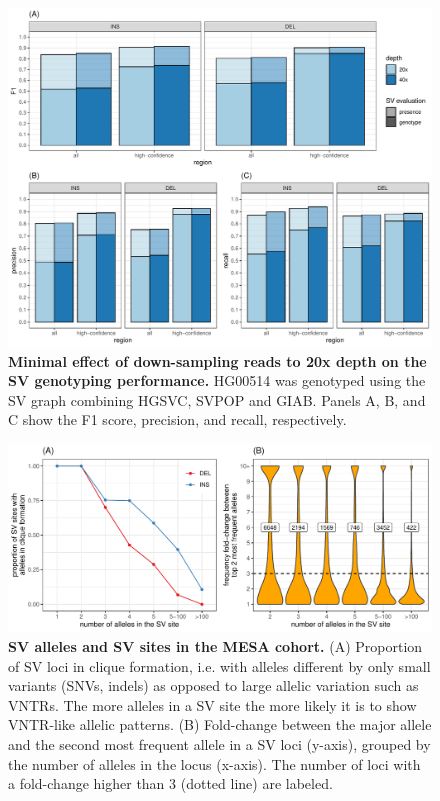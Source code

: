 \documentclass[11pt]{ucscthesis}
\begin{document}
\begin{figure}[H]
    \centering
    \includegraphics[width=.9\linewidth, page=1]{fig-sveval.pdf}
    \caption[Minimal effect of down-sampling reads to 20x depth on the SV genotyping performance]{{\bf Minimal effect of down-sampling reads to 20x depth on the SV genotyping performance.}
      HG00514 was genotyped using the SV graph combining HGSVC, SVPOP and GIAB.
      Panels A, B, and C show the F1 score, precision, and recall, respectively.
    }
    \label{fig:sveval-depth}
\end{figure}



\begin{figure}[H]
    \centering
    \includegraphics[width=.9\linewidth]{fig-sv-mesa-stats-2.pdf}
    \caption[SV alleles and SV sites in the MESA cohort]{{\bf SV alleles and SV sites in the MESA cohort.}
      (A) Proportion of SV loci in clique formation, i.e. with alleles different by only small variants (SNVs, indels) as opposed to large allelic variation such as VNTRs.
      The more alleles in a SV site the more likely it is to show VNTR-like allelic patterns.
      (B) Fold-change between the major allele and the second most frequent allele in a SV loci (y-axis), grouped by the number of alleles in the locus (x-axis).
      The number of loci with a fold-change higher than 3 (dotted line) are labeled.
    }
    \label{fig:svsites_mesa}
\end{figure}
\end{document}
